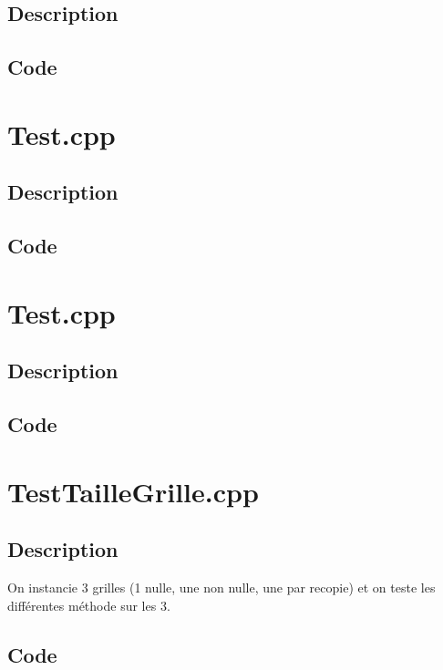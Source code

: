         \subsection{Description}
        \subsection{Code}
    \section{Test.cpp}
        \subsection{Description}
        \subsection{Code}
    \section{Test.cpp}
        \subsection{Description}
        \subsection{Code}
    \section{TestTailleGrille.cpp}
        \subsection{Description}
            On instancie 3 grilles (1 nulle, une non nulle, une par recopie) et on teste les différentes méthode sur les 3.
        \subsection{Code}
